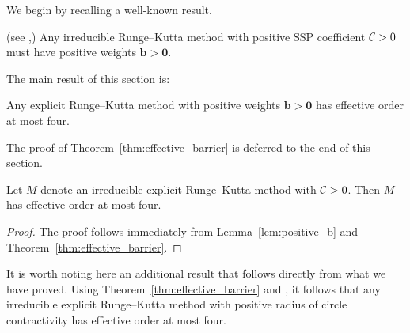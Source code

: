 %
We begin by recalling a well-known result.
\begin{lemma}\label{lem:positive_b}(see \cite[Theorem~4.2]{Kraaijevanger1991},\cite[Lemma 4.2]{Ruuth2002})
	Any irreducible Runge--Kutta method with positive SSP coefficient $\mathcal{C}>0$
	must have positive weights $\bm{b} > \bm{0}$.
\end{lemma}
The main result of this section is:
\begin{theorem}\label{thm:effective_barrier}
	Any explicit Runge--Kutta method with positive weights $\bm{b} > \bm{0}$ 
	has effective order at most four.
\end{theorem}
The proof of Theorem~\ref{thm:effective_barrier} is deferred to
the end of this section.
\begin{corollary}\label{cor:no_SSP_5}
    Let $M$ denote an irreducible explicit Runge--Kutta method with $\mathcal{C}>0$.
    Then $M$ has effective order at most four.
\end{corollary}
\begin{proof}
	The proof follows immediately from Lemma~\ref{lem:positive_b} and 
	Theorem~\ref{thm:effective_barrier}.
\end{proof}

\begin{remark}
    It is worth noting here an additional result that 
    follows directly from what we have proved.
    Using Theorem~\ref{thm:effective_barrier} and \cite[Theorem~4.1]{dahlquist2006}, 
    it follows that any irreducible explicit Runge--Kutta method with positive radius of
    circle contractivity has effective order at most four.
\end{remark}


